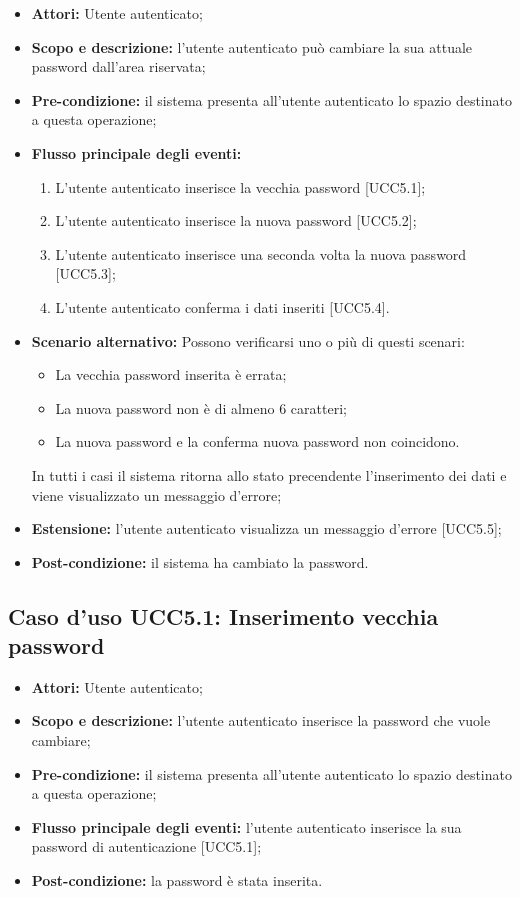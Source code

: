 \begin{itemize}
\item \textbf{Attori:} Utente autenticato;
\item \textbf{Scopo e descrizione:} l'utente autenticato può cambiare la sua attuale password dall'area riservata;
\item \textbf{Pre-condizione:} il sistema presenta all'utente autenticato lo spazio destinato a questa operazione;
\item \textbf{Flusso principale degli eventi:}
\begin{enumerate}
\item L'utente autenticato inserisce la vecchia password [UCC5.1];
\item L'utente autenticato inserisce la nuova password [UCC5.2];
\item L'utente autenticato inserisce una seconda volta la nuova password [UCC5.3];
\item L'utente autenticato conferma i dati inseriti [UCC5.4].
\end{enumerate}
\item \textbf{Scenario alternativo:} Possono verificarsi uno o più di questi scenari:
\begin{itemize}
\item La vecchia password inserita è errata;
\item La nuova password non è di almeno 6 caratteri;
\item La nuova password e la conferma nuova password non coincidono.
\end{itemize}
In tutti i casi il sistema ritorna allo stato precendente l'inserimento dei dati e viene visualizzato un messaggio d'errore;
\item \textbf{Estensione:} l'utente autenticato visualizza un messaggio d'errore [UCC5.5];
\item \textbf{Post-condizione:} il sistema ha cambiato la password.
\end{itemize}

\subsection{Caso d'uso UCC5.1: Inserimento vecchia password}

\begin{itemize}
\item \textbf{Attori:} Utente autenticato;
\item \textbf{Scopo e descrizione:} l'utente autenticato inserisce la password che vuole cambiare;
\item \textbf{Pre-condizione:} il sistema presenta all'utente autenticato lo spazio destinato a questa operazione;
\item \textbf{Flusso principale degli eventi:} l'utente autenticato inserisce la sua password di autenticazione [UCC5.1];
\item \textbf{Post-condizione:} la password è stata inserita.
\end{itemize}


